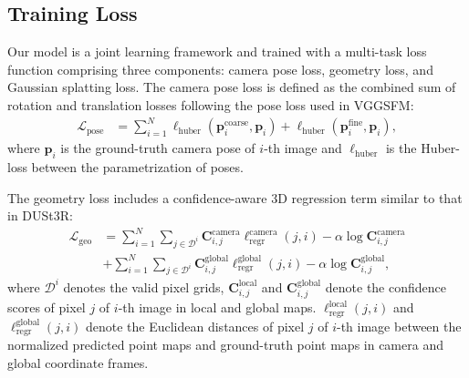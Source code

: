 

\subsection{Training Loss}\label{method:training}
Our model is a joint learning framework and trained with a multi-task loss function comprising three components: camera pose loss, geometry loss, and Gaussian splatting loss. 
The camera pose loss is defined as the combined sum of rotation and translation losses following the pose loss used in VGGSFM:
\begin{align}
     \mathcal{L}_{\text{pose}} &= \sum_{i=1}^{N} \ell_{\text{huber}}(\mathbf{p}_i^{\text{coarse}}, \mathbf{p}_i) + \ell_{\text{huber}}(\mathbf{p}_i^{\text{fine}}, \mathbf{p}_i),
\end{align}
where $\mathbf{p}_i$ is the ground-truth camera pose of $i$-th image and $\ell_{\text{huber}}$ is the Huber-loss between the parametrization of poses.



The geometry loss includes a confidence-aware 3D regression term similar to that in DUSt3R:
\begin{align}
        \mathcal{L}_{\text{geo}} &= \sum_{i=1}^{N} \sum_{j\in\mathcal{D}^i} \mathbf{C}_{i, j}^\text{camera}\ell_{\text{regr}}^{\text{camera}}(j,i) - \alpha\log \mathbf{C}_{i, j}^\text{camera} \\ &+ \sum_{i=1}^{N} \sum_{j\in\mathcal{D}^i} \mathbf{C}_{i, j}^\text{global}\ell_{\text{regr}}^{\text{global}}(j,i) - \alpha\log \mathbf{C}_{i, j}^\text{global},
\end{align}
where $\mathcal{D}^i$ denotes the valid pixel grids, $\mathbf{C}_{i, j}^\text{local}$ and $\mathbf{C}_{i, j}^\text{global}$ denote the confidence scores of pixel $j$ of $i$-th image in local and global maps. $\ell_{\text{regr}}^{\text{local}}(j,i)$ and $\ell_{\text{regr}}^{\text{global}}(j,i)$ denote the Euclidean distances of pixel $j$ of $i$-th image between the normalized predicted point maps and ground-truth point maps in camera and global coordinate frames. 


